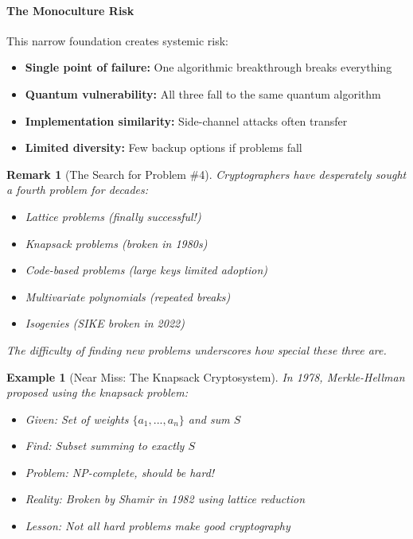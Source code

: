 \documentclass[11pt,a4paper]{article}
\newtheorem{example}{Example}
\newtheorem{remark}{Remark}
\begin{document}
\paragraph{The Monoculture Risk}

This narrow foundation creates systemic risk:

\begin{itemize}
    \item \textbf{Single point of failure:} One algorithmic breakthrough breaks everything
    \item \textbf{Quantum vulnerability:} All three fall to the same quantum algorithm
    \item \textbf{Implementation similarity:} Side-channel attacks often transfer
    \item \textbf{Limited diversity:} Few backup options if problems fall
\end{itemize}

\begin{remark}[The Search for Problem \#4]
Cryptographers have desperately sought a fourth problem for decades:
\begin{itemize}
    \item Lattice problems (finally successful!)
    \item Knapsack problems (broken in 1980s)
    \item Code-based problems (large keys limited adoption)
    \item Multivariate polynomials (repeated breaks)
    \item Isogenies (SIKE broken in 2022)
\end{itemize}
The difficulty of finding new problems underscores how special these three are.
\end{remark}

\begin{example}[Near Miss: The Knapsack Cryptosystem]
In 1978, Merkle-Hellman proposed using the knapsack problem:
\begin{itemize}
    \item Given: Set of weights $\{a_1, ..., a_n\}$ and sum $S$
    \item Find: Subset summing to exactly $S$
    \item Problem: NP-complete, should be hard!
    \item Reality: Broken by Shamir in 1982 using lattice reduction
    \item Lesson: Not all hard problems make good cryptography
\end{itemize}
\end{example}
\end{document}
